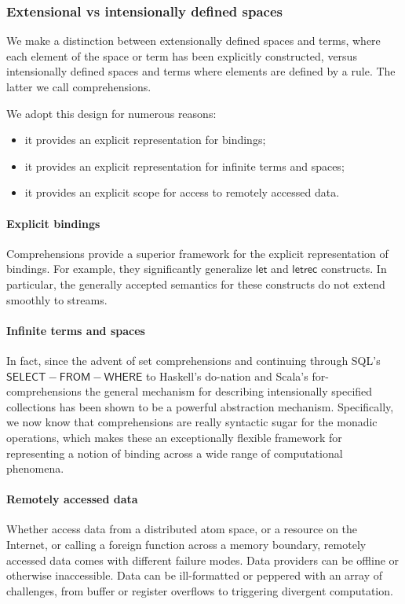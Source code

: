 \subsubsection{Extensional vs intensionally defined spaces}
We make a distinction between extensionally defined spaces and terms, where each element of the space or term has been explicitly constructed, versus intensionally defined spaces and terms where elements are defined by a rule. The latter we call comprehensions.

We adopt this design for numerous reasons:
\begin{itemize}
  \item it provides an explicit representation for bindings;
  \item it provides an explicit representation for infinite terms and spaces;
  \item it provides an explicit scope for access to remotely accessed data.
\end{itemize}

\paragraph{Explicit bindings} Comprehensions provide a superior framework for the explicit representation of bindings. For example, they significantly generalize $\mathsf{let}$ and $\mathsf{letrec}$ constructs. In particular, the generally accepted semantics for these constructs do not extend smoothly to streams.

\paragraph{Infinite terms and spaces}
In fact, since the advent of set comprehensions and continuing through SQL's $\mathsf{SELECT-FROM-WHERE}$ to Haskell's do-nation and Scala's for-comprehensions the general mechanism for describing intensionally specified collections has been shown to be a powerful abstraction mechanism. Specifically, we now know that comprehensions are really syntactic sugar for the monadic operations, which makes these an exceptionally flexible framework for representing a notion of binding across a wide range of computational phenomena.

\paragraph{Remotely accessed data} Whether access data from a distributed atom space, or a resource on the Internet, or calling a foreign function across a memory boundary, remotely accessed data comes with different failure modes. Data providers can be offline or otherwise inaccessible. Data can be ill-formatted or peppered with an array of challenges, from buffer or register overflows to triggering divergent computation.

